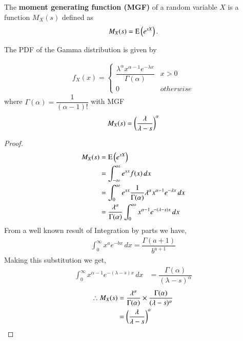     \begin{definition}
    The \textbf{moment generating function (MGF)} of a random variable $X$ is a function $ M_X(s) $ defined as
    \begin{align}
        M_X(s) = \text{E}\left( e^{sX} \right).
    \end{align}
    \end{definition}
    \begin{lemma}
        The PDF of the Gamma distribution is given by 
     
     \begin{align}
    f_{X}(x)  = 
    \begin{cases}
    \dfrac{\lambda^{\alpha}x^{\alpha-1}e^{-\lambda x}}{\Gamma(\alpha)} &  x > 0
    \\
    0 & otherwise
    \end{cases}
    \end{align}
    where $ \Gamma(\alpha) = \dfrac{1}{(\alpha-1)!}$
with MGF
    \begin{align}
        M_X(s) = \left(\dfrac{\lambda}{\lambda-s}\right)^{\alpha}
    \end{align}
    \end{lemma}
    \begin{proof}
    \begin{align}
        M_X(s) &= \text{E}\left( e^{sX} \right) \\
        &=  \int_{-\infty}^{\infty} e^{sx} f(x)\,dx \\
        &=    \int_{0}^{\infty} e^{sx} \dfrac{1}{\Gamma(\alpha)} \lambda^\alpha x^{\alpha-1}e^{-\lambda x}\,dx \\
        &= \dfrac{\lambda^\alpha}{\Gamma(\alpha)} \int_{0}^{\infty} x^{\alpha-1} e^{-(\lambda - s) x}\,dx 
    \end{align}
    From a well known result of Integration by parts we have,
    \begin{align}
        \int_{0}^{\infty} x^a e^{-bx}\,dx = \dfrac{\Gamma(a+1)}{b^{a+1}}
        \label{stats/4/eqidentity}
    \end{align}
    Making this substitution we get,
    \begin{align}
      \int_{0}^{\infty} x^{\alpha-1} e^{-(\lambda - s) x}\,dx    &= \dfrac{\Gamma(\alpha)}{(\lambda - s)^\alpha}
    \end{align}
    \begin{align}
    \therefore     M_X(s) &= \dfrac{\lambda^\alpha}{\Gamma(\alpha)} \times \dfrac{\Gamma(\alpha)}{(\lambda-s)^\alpha} \\
         &= \left(\dfrac{\lambda}{\lambda-s}\right)^\alpha
    \end{align}
    \end{proof}
